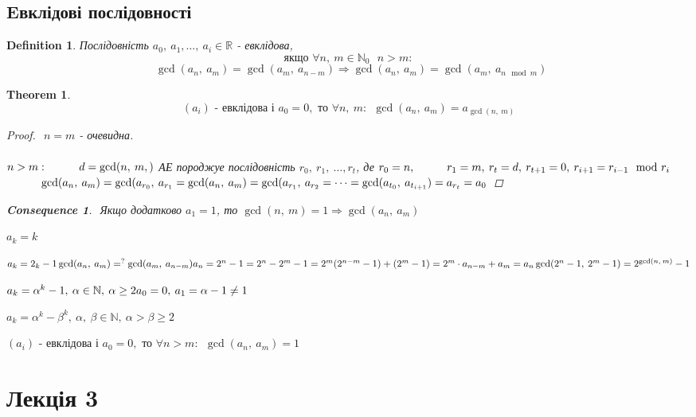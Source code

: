 \documentclass[a4paper,12pt, centered]{bookest}
\newtheorem{theorem}{Theorem}[section]
\newtheorem{definition}{Definition}[section]
\newtheorem*{cons*}{Consequence}
\newcommand\tab[1][1cm]{\hspace*{#1}}
\begin{document}
\section{Eвклідові послідовності}
\begin{definition}
Послідовність $a_0,\>a_1,\dots,\>a_i\in\mathbb{R}$ - евклідова,  $$\textrm{якщо } \forall n,\>m\in\mathbb{N}_0\
\>\>n>m:$$$$\>\>\gcd(a_n,\>a_m)=\gcd(a_m,\>a_{n-m})\Rightarrow\gcd(a_n,\>a_m)=\gcd(a_m,\>a_{n\mod m})$$
\end{definition}
\begin{theorem}
	$$(a_i)\textrm{ - евклідова і } a_0=0,\textrm{ то }\forall n,\>m:\>\>\gcd(a_n,\>a_m)=a_{\gcd(n,\>m)}$$
	\begin{proof}$ $
		$n=m$ - очевидна.\\\\
		$n>m:\\\tab d=\gcd(n,\>m,)$ АЕ породжуе послідовність $r_0,\>r_1,\>\dots,r_t$, де $r_0=n,\\\tab r_1=m,\>r_t=d,\>r_{t+1}=0,\>r_{i+1}=r_{i-1}\mod r_i$ $\\\tab \gcd(a_n,\>a_m)=\gcd(a_{r_0},\>a_{r_1}=\gcd(a_n,\>a_m)=\gcd(a_{r_1},\>a_{r_2}=\dots=\gcd(a_{t_0},\>a_{t_{i+1}})=a_{r_t}=a_0$
	\end{proof}
	\begin{cons*}$ $
		Якщо додатково $a_1=1$, то $\gcd(n,\>m)=1\Rightarrow\gcd(a_n,\>a_m)$
	\end{cons*}
\end{theorem}
\begin{example}
	$a_k=k$	
\end{example}
\begin{example}
	$a_k=2_k-1\\\gcd(a_n,\>a_m)=^{?}\gcd(a_m,\>a_{n-m})\\a_n=2^n-1=2^n-2^m-1=2^m(2^{n-m}-1)+(2^m-1)=2^m\cdot a_{n-m}+a_m=a_n\\\gcd(2^n-1,\>2^m-1)=2^{\gcd(n,\>m)}-1$	
\end{example}
\begin{example}
	$a_k=\alpha^k-1,\>\alpha\in\mathbb{N},\>\alpha\geq 2\\a_0=0,\>a_1=\alpha-1\neq 1$	
\end{example}
\begin{example}
	$a_k=\alpha^k-\beta^k,\>\alpha,\>\beta\in\mathbb{N},\>\alpha>\beta\geq 2$	
\end{example}
$(a_i)\textrm{ - евклідова і } a_0=0,\textrm{ то }\forall n>m:\>\>\gcd(a_n,\>a_m)=1$
\let\cleardoublepage\clearpage
\chapter{Лекція 3}
\end{document}
